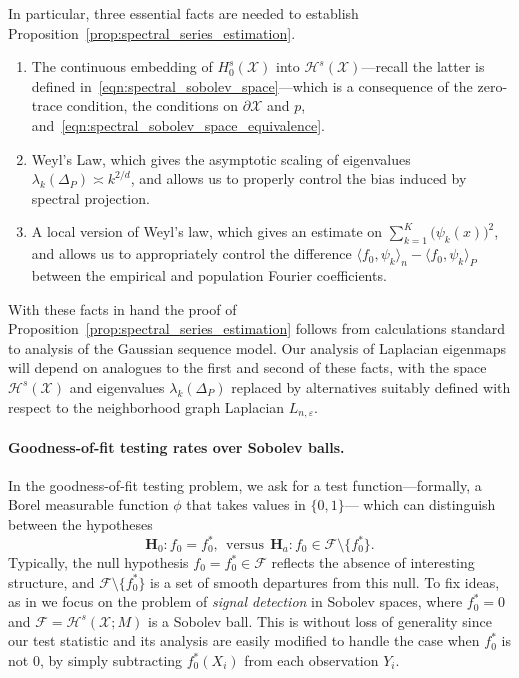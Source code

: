 \documentclass{article}
\newcommand{\1}{\mathbf{1}}
\newcommand{\mc}[1]{\mathcal{#1}}
\newcommand{\dotp}[2]{\langle #1, #2 \rangle}
\theoremstyle{alden}
\theoremstyle{aldenthm}
\theoremstyle{definition}
\theoremstyle{remark}
\begin{document}
In particular, three essential facts are needed to establish Proposition~\ref{prop:spectral_series_estimation}. 
\begin{enumerate}
	\item The continuous embedding of $H_0^s(\mc{X})$ into $\mc{H}^s(\mc{X})$---recall the latter is defined in~\eqref{eqn:spectral_sobolev_space}---which is a consequence of the zero-trace condition, the conditions on $\partial \mc{X}$ and $p$, and~\eqref{eqn:spectral_sobolev_space_equivalence}.
	\item Weyl's Law, which gives the asymptotic scaling of eigenvalues $\lambda_{k}(\Delta_P) \asymp k^{2/d}$, and allows us to properly control the bias induced by spectral projection.
	\item A local version of Weyl's law, which gives an estimate on $\sum_{k = 1}^{K} \bigl(\psi_k(x)\bigr)^2$, and allows us to appropriately control the difference $\dotp{f_0}{\psi_k}_n - \dotp{f_0}{\psi_k}_P$  between the empirical and population Fourier coefficients.
\end{enumerate}
With these facts in hand the proof of Proposition~\ref{prop:spectral_series_estimation} follows from calculations standard to analysis of the Gaussian sequence model. Our analysis of Laplacian eigenmaps will depend on analogues to the first and second of these facts, with the space $\mc{H}^s(\mc{X})$ and eigenvalues $\lambda_k(\Delta_P)$ replaced by alternatives suitably defined with respect to the neighborhood graph Laplacian $L_{n,\varepsilon}$.

\paragraph{Goodness-of-fit testing rates over Sobolev balls.}
In the goodness-of-fit testing problem, we ask for a test function---formally, a Borel measurable function $\phi$ that takes values in $\{0,1\}$--- which can distinguish between the hypotheses
\begin{equation}
\mathbf{H}_0: f_0 = f_0^{\ast}, ~~\textrm{versus}~~ \mathbf{H}_a: f_0 \in \mc{F} \setminus \{f_0^{\ast}\}.
\end{equation} 
Typically, the null hypothesis $f_0 = f_0^{\ast} \in \mc{F}$ reflects the absence of interesting structure, and $\mc{F} \setminus  \{f_0^{\ast}\}$ is a set of smooth departures from this null. To fix ideas, as in \citet{ingster2009} we focus on the problem of \emph{signal detection} in Sobolev spaces, where $f_0^{\ast} = 0$ and $\mc{F} = \mc{H}^s(\mc{X};M)$ is a Sobolev ball. This is without loss of generality since our test statistic and its analysis are easily modified to handle the case when $f_0^{\ast}$ is not $0$, by simply subtracting $f_0^{\ast}(X_i)$ from each observation $Y_i$.
\end{document}
